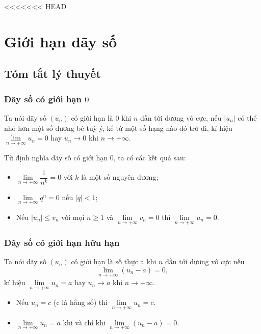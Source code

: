 <<<<<<< HEAD
\section{Giới hạn dãy số}
\subsection{Tóm tắt lý thuyết}
\subsubsection{Dãy số có giới hạn $0$}
	\begin{dn}
		Ta nói dãy số $\left(u_{n}\right)$ có giới hạn là $0$ khi $n$ dần tới dương vô cực, nếu $\left|u_{n}\right|$ có thể nhỏ hơn một số dương bé tuỳ ý, kể từ một số hạng nào đó trở đi, kí hiệu $\lim \limits_{n \rightarrow+\infty} u_{n}=0$ hay $u_{n} \rightarrow 0$ khi $n \rightarrow+\infty$.
	\end{dn}
	Từ định nghĩa dãy số có giới hạn $0$, ta có các kết quả sau:
	\begin{itemize}
		\item $\lim \limits_{n \rightarrow+\infty} \dfrac{1}{n^{k}}=0$ với $k$ là một số nguyên dương;	
		\item $\lim \limits_{n \rightarrow+\infty} q^{n}=0$ nếu $|q|<1$;	
		\item Nếu $\left|u_{n}\right| \leq v_{n}$ với mọi $n \geq 1$ và $\lim \limits_{n \rightarrow+\infty} v_{n}=0$ thì $\lim \limits_{n \rightarrow+\infty} u_{n}=0$.	
	\end{itemize}
	\subsubsection{Dãy số có giới hạn hữu hạn}
	\begin{dn}
		Ta nói dãy số $\left(u_{n}\right)$ có giới hạn là số thực a khi $n$ dần tới dương vô cực nếu $$\lim \limits_{n \rightarrow+\infty}\left(u_{n}-a\right)=0,$$ kí hiệu $\lim \limits_{n \rightarrow+\infty} u_{n}=a$ hay $u_{n} \rightarrow a$ khi $n \rightarrow+\infty$. 
	\end{dn}
	\begin{itemize}
		\item Nếu $u_{n}=c$ (c là hằng số) thì $\lim \limits_{n \rightarrow+\infty} u_{n}=c$. 
		\item $\lim \limits_{n \rightarrow+\infty} u_{n}=a$ khi và chỉ khi $\lim \limits_{n \rightarrow+\infty}\left(u_{n}-a\right)=0$.
	\end{itemize}
